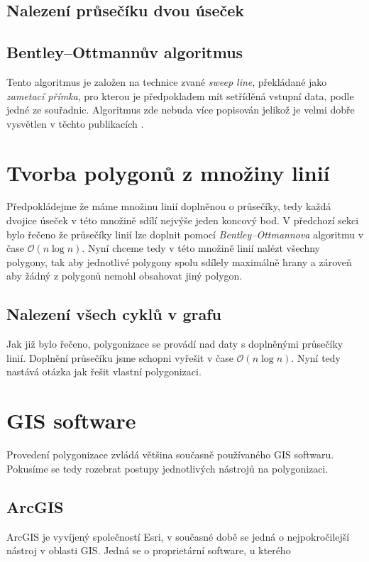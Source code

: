 \subsection{Nalezení průsečíku dvou úseček}


\subsection{Bentley–Ottmannův algoritmus}
Tento algoritmus je založen na technice zvané \textit{sweep line}, překládané jako \textit{zametací přímka}, pro kterou je předpokladem mít setříděná vstupní data, podle jedné ze souřadnic. Algoritmus zde nebuda více popisován jelikož je velmi dobře vysvětlen v těchto publikacích \cite{bentley1979algorithms} \cite{bayer2008algoritmy}.

\section{Tvorba polygonů z množiny linií}
Předpokládejme že máme množinu linií doplněnou o průsečíky, tedy každá dvojice úseček v této množině sdílí nejvýše jeden koncový bod. V předchozí sekci bylo řečeno že průsečíky linií lze doplnit pomocí \textit{Bentley–Ottmannova} algoritmu v čase $\mathcal{O}(n\log{}n)$. Nyní chceme tedy v této množině linií nalézt všechny polygony, tak aby jednotlivé polygony spolu sdílely maximálně hrany a zároveň aby žádný z polygonů nemohl obsahovat jiný polygon.
	
\subsection{Nalezení všech cyklů v grafu}




Jak již bylo řečeno, polygonizace se provádí nad daty s doplněnými průsečíky linií. Doplnění průsečíku jsme schopni vyřešit v čase $\mathcal{O}(n\log{}n)$. Nyní tedy nastává otázka jak řešit vlastní polygonizaci.


\section{GIS software}
Provedení polygonizace zvládá většina současně používaného GIS softwaru. Pokusíme se tedy rozebrat postupy jednotlivých nástrojů na polygonizaci.

\subsection{ArcGIS}
ArcGIS je vyvíjený společností Esri, v současné době se jedná o nejpokročilejší nástroj v oblasti GIS. Jedná se o proprietární software, u kterého 


